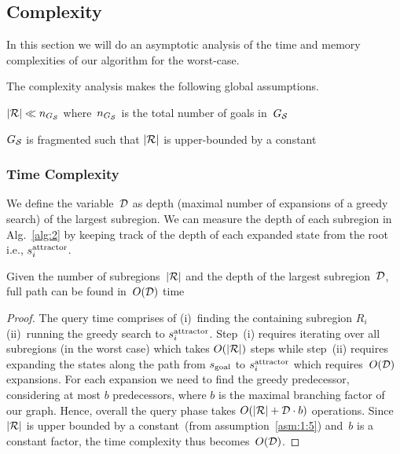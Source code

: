 \documentclass[a4paper]{report}
\begin{document}
\subsection{Complexity}
In this section we will do an asymptotic analysis of the time and memory complexities of our algorithm for the worst-case.

The complexity analysis makes the following global assumptions.
\vspace{2mm}\begin{assumption}
\label{asm:1:4} $|\mathcal{R}| \ll n_{G_{\mathcal{S}}}$ where~$n_{G_{\mathcal{S}}}$ is the total number of goals in~$G_\mathcal{S}$
\end{assumption}
\vspace{2mm}\begin{assumption}
\label{asm:1:5} $G_\mathcal{S}$ is fragmented such that $|\mathcal{R}|$ is upper-bounded by a constant
\end{assumption}

\label{subsec:complexity}
\subsubsection{Time Complexity}
We define the variable~$\mathcal{D}$ as depth (maximal number of expansions of a greedy search) of the largest subregion. We can measure the depth of each subregion in Alg.~\ref{alg:2} by keeping track of the depth of each expanded state from the root i.e., $s^{\text{attractor}}_i$.
%
\vspace{2mm}
\begin{lemma}
\label{lemma:unboundedD}
Given the number of subregions~$|\mathcal{R}|$ and the depth of the largest subregion~$\mathcal{D}$, full path can be found in~$O(\mathcal{D})$ time
\end{lemma}

\begin{proof}
The query time comprises of 
(i)~finding the containing subregion $R_i$
(ii)~running the greedy search to $s^{\text{attractor}}_i$.
Step~(i) requires iterating over all subregions (in the worst case) which takes $O(|\mathcal{R}|)$ steps while 
step~(ii) requires expanding the states along the path from $s_{\text{goal}}$ to $s^{\text{attractor}}_i$ which requires~$O(\mathcal{D})$ expansions.
For each expansion we need to find the greedy predecessor, considering at most $b$ predecessors, where $b$ is the maximal branching factor of our graph.
Hence, overall the query phase takes $O(|\mathcal{R}| + \mathcal{D} \cdot b)$ operations. Since~$|\mathcal{R}|$ is upper bounded by a constant~(from assumption~\ref{asm:1:5}) and~$b$ is a constant factor, the time complexity thus becomes~$O(\mathcal{D})$.
\end{proof}
\end{document}
